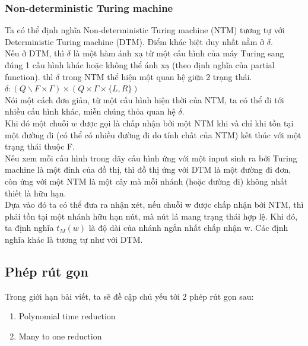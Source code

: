 \documentclass[a4paper 14pt]{article}
\begin{document}
			\subsubsection{Non-deterministic Turing machine}
				Ta có thể định nghĩa Non-deterministic Turing machine (NTM) tương tự với Deterministic Turing machine (DTM). Điểm khác biệt duy nhất nằm ở $\delta$.\\
				Nếu ở DTM, thì $\delta$ là một hàm ánh xạ từ một cấu hình của máy Turing sang đúng 1 cấu hình khác hoặc không thể ánh xạ (theo định nghĩa của partial function). thì $\delta$ trong NTM thể hiện một quan hệ giữa 2 trạng thái.\\
				$\delta: (Q\backslash F \times \Gamma) \times (Q \times \Gamma \times \{L,R\})$\\
				Nói một cách đơn giản, từ một cấu hình hiện thời của NTM, ta có thể đi tới nhiều cấu hình khác, miễn chúng thỏa quan hệ $\delta$.\\
				Khi đó một chuỗi $w$ được gọi là chấp nhận bởi một NTM khi và chỉ khi tồn tại một đường đi (có thể có nhiều đường đi do tính chất của NTM) kết thúc với một trạng thái thuộc F.\\
				Nếu xem mỗi cấu hình trong dãy cấu hình ứng với một input sinh ra bởi Turing machine là một đỉnh của đồ thị, thì đồ thị ứng với DTM là một đường đi đơn, còn ứng với một NTM là một cây mà mỗi nhánh (hoặc đường đi) không nhất thiết là hữu hạn.\\
				Dựa vào đó ta có thể đưa ra nhận xét, nếu chuỗi w được chấp nhận bởi NTM, thì phải tồn tại một nhánh hữu hạn nút, mà nút lá mang trạng thái hợp lệ. Khi đó, ta định nghĩa $t_M(w)$ là độ dài của nhánh ngắn nhất chấp nhận w. Các định nghĩa khác là tương tự như với DTM.\\ 
		\subsection{Phép rút gọn}
			Trong giới hạn bài viết, ta sẽ đề cập chủ yếu tới 2 phép rút gọn sau:
			\begin{enumerate}
				\item Polynomial time reduction
				\item Many to one reduction
			\end{enumerate}
\end{document}
